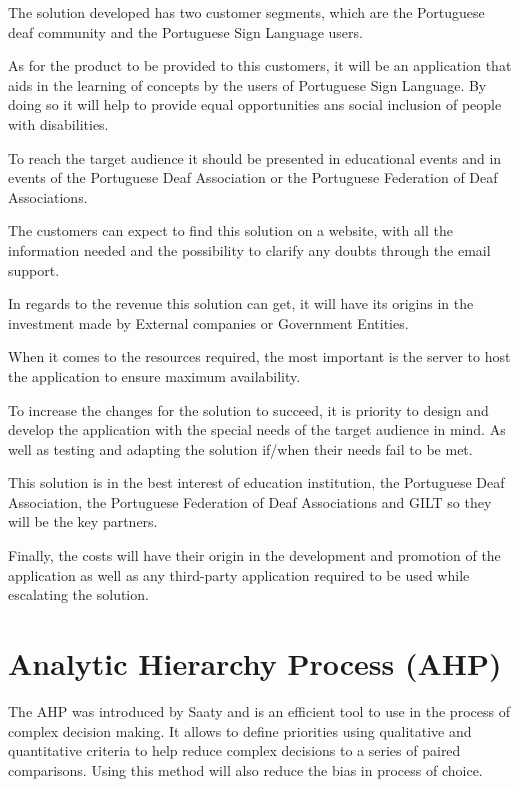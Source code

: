 The solution developed has two customer segments, which are the Portuguese deaf community and the Portuguese Sign Language users.

As for the product to be provided to this customers, it will be an application that aids in the learning of concepts by the users of Portuguese Sign Language.
By doing so it will help to provide equal opportunities ans social inclusion of people with disabilities.

To reach the target audience it should be presented in educational events and in events of the Portuguese Deaf Association or the Portuguese Federation of Deaf Associations.

The customers can expect to find this solution on a website, with all the information needed and the possibility to clarify any doubts through the email support.

In regards to the revenue this solution can get, it will have its origins in the investment made by External companies or Government Entities.

When it comes to the resources required, the most important is the server to host the application to ensure maximum availability.

To increase the changes for the solution to succeed, it is priority to design and develop the application with the special needs of the target audience in mind.
As well as testing and adapting the solution if/when their needs fail to be met.

This solution is in the best interest of education institution, the Portuguese Deaf Association, the Portuguese Federation of Deaf Associations and GILT so they will be the key partners.

Finally, the costs will have their origin in the development and promotion of the application as well as any third-party application required to be used while escalating the solution.

\section{Analytic Hierarchy Process (AHP)}

The \gls{AHP} was introduced by Saaty\cite{saaty1987analytic} and is an efficient tool to use in the process of complex decision making.
It allows to define priorities using qualitative and quantitative criteria to help reduce complex decisions to a series of paired comparisons.
Using this method will also reduce the bias in process of choice.

